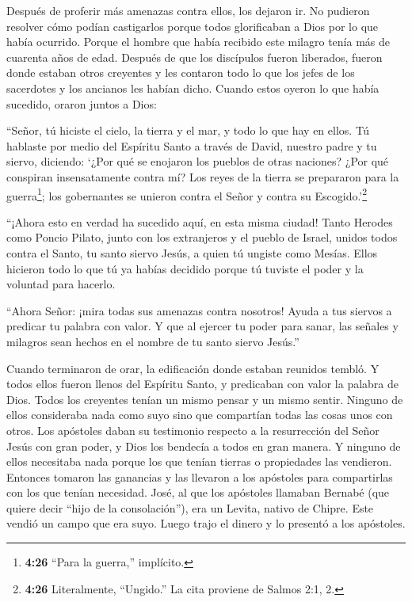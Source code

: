  Después de proferir más amenazas contra ellos, los dejaron
ir. No pudieron resolver cómo podían castigarlos porque todos
glorificaban a Dios por lo que había ocurrido.  Porque el
hombre que había recibido este milagro tenía más de cuarenta años de
edad.  Después de que los discípulos fueron liberados,
fueron donde estaban otros creyentes y les contaron todo lo que los
jefes de los sacerdotes y los ancianos les habían dicho. 
Cuando estos oyeron lo que había sucedido, oraron juntos a Dios:

``Señor, tú hiciste el cielo, la tierra y el mar, y todo lo que hay en
ellos.  Tú hablaste por medio del Espíritu Santo a través
de David, nuestro padre y tu siervo, diciendo: `¿Por qué se enojaron los
pueblos de otras naciones? ¿Por qué conspiran insensatamente contra mí?
 Los reyes de la tierra se prepararon para la
guerra\footnote{\textbf{4:26} ``Para la guerra,'' implícito.}; los
gobernantes se unieron contra el Señor y contra su Escogido.'\footnote{\textbf{4:26}
  Literalmente, ``Ungido.'' La cita proviene de Salmos 2:1, 2.}

 ``¡Ahora esto en verdad ha sucedido aquí, en esta misma
ciudad! Tanto Herodes como Poncio Pilato, junto con los extranjeros y el
pueblo de Israel, unidos todos contra el Santo, tu santo siervo Jesús, a
quien tú ungiste como Mesías.  Ellos hicieron todo lo que
tú ya habías decidido porque tú tuviste el poder y la voluntad para
hacerlo.

 ``Ahora Señor: ¡mira todas sus amenazas contra nosotros!
Ayuda a tus siervos a predicar tu palabra con valor.  Y que
al ejercer tu poder para sanar, las señales y milagros sean hechos en el
nombre de tu santo siervo Jesús.''

 Cuando terminaron de orar, la edificación donde estaban
reunidos tembló. Y todos ellos fueron llenos del Espíritu Santo, y
predicaban con valor la palabra de Dios.  Todos los
creyentes tenían un mismo pensar y un mismo sentir. Ninguno de ellos
consideraba nada como suyo sino que compartían todas las cosas unos con
otros.  Los apóstoles daban su testimonio respecto a la
resurrección del Señor Jesús con gran poder, y Dios los bendecía a todos
en gran manera.  Y ninguno de ellos necesitaba nada porque
los que tenían tierras o propiedades las vendieron. 
Entonces tomaron las ganancias y las llevaron a los apóstoles para
compartirlas con los que tenían necesidad.  José, al que
los apóstoles llamaban Bernabé (que quiere decir ``hijo de la
consolación''), era un Levita, nativo de Chipre.  Este
vendió un campo que era suyo. Luego trajo el dinero y lo presentó a los
apóstoles.

